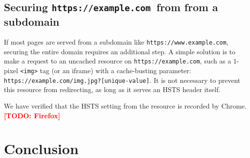\documentclass[conference]{./IEEEtran}
\newcommand{\todo}[1]{\textcolor{red}{\textbf{[TODO: #1]}}}
\newcommand{\site}[1]{\texttt{#1}}
\newcommand{\code}[1]{\texttt{#1}}
\newcommand{\genericsite}{example.com}
\newcommand{\s}{{\site{https://\genericsite}}}
\newcommand{\sw}{{\site{https://www.\genericsite}}}
\theoremstyle{plain}
\begin{document}
\subsection{Securing \s~from from a subdomain}

If most pages are served from a subdomain like \sw, securing the entire domain requires an additional step. A simple solution is to make a request to an uncached resource on \s, such as a $1$-pixel \code{<img>} tag (or an iframe) with a cache-busting parameter: \site{\s/img.jpg?[unique-value]}. It is not necessary to prevent this resource from redirecting, as long as it serves an HSTS header itself.

We have verified that the HSTS setting from the resource is recorded by Chrome. \todo{Firefox}

\section{Conclusion}



\end{document}
